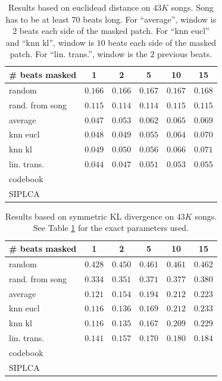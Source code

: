 \documentclass{article}
\begin{document}
\begin{table}[t]
\begin{center}
\begin{tabular}{l|c|c|c|c|c|}
\# beats masked & 1 & 2 & 5 & 10 & 15 \\ \hline \hline
random & $0.166$ & $0.166$ & $0.167$ & $0.167$ & $0.168$  \\
rand. from song & $0.115$ & $0.114$ & $0.114$ & $0.115$ & $0.115$  \\
average & $0.047$ & $0.053$ & $0.062$ & $0.065$ & $\mathbf{0.069}$ \\
knn eucl & $0.048$ & $0.049$ & $0.055$ & $0.064$ &  $0.070$ \\
knn kl & $0.049$ & $0.050$ & $0.056$ & $0.066$ &  $0.071$ \\
lin. trans. & $\mathbf{0.044}$ & $\mathbf{0.047}$ & $\mathbf{0.051}$ & $\mathbf{0.053}$ & $\mathbf{0.055}$ \\
codebook & & & & &  \\
SIPLCA & & & & &  \\ \hline
\end{tabular}
\caption{Results based on euclidead distance on $43K$ songs.
Song has to be at least $70$ beats long. 
For ``average'', window is $2$ beats each side of the masked patch.
For ``knn eucl'' and ``knn kl'', window is $10$ beats each side of the masked patch.
For ``lin. trans.'', window is the $2$ previous beats.}
\label{tab:reseucl}
\end{center}
\end{table}

\begin{table}[t]
\begin{center}
\begin{tabular}{l|c|c|c|c|c|}
\# beats masked & 1 & 2 & 5 & 10 & 15 \\ \hline \hline
random & $0.428$ & $0.450$ & $0.461$ & $0.461$ & $0.462$  \\
rand. from song & $0.334$ & $0.351$ & $0.371$ & $0.377$ & $0.380$  \\
average & $0.121$ & $0.154$ & $0.194$ & $0.212$ &  $0.223$ \\
knn eucl & $\mathbf{0.116}$ & $0.136$ & $0.169$ & $0.212$ & $0.233$ \\
knn kl & $\mathbf{0.116}$ & $\mathbf{0.135}$ & $\mathbf{0.167}$ & $0.209$ & $0.229$ \\
lin. trans. & $0.141$ & $0.157$ & $0.170$ & $\mathbf{0.180}$ & $\mathbf{0.184}$ \\
codebook & & & & &  \\
SIPLCA & & & & &  \\ \hline
\end{tabular}
\caption{Results based on symmetric KL divergence on $43K$ songs.
See Table \ref{tab:reseucl} for the exact parameters used.}
\label{tab:reskl}
\end{center}
\end{table}
\end{document}
